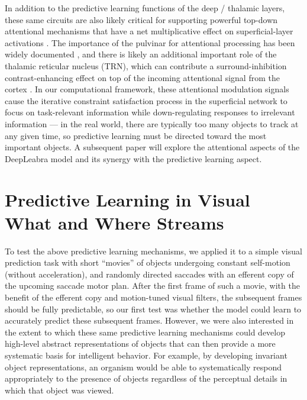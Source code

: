 \documentclass[11pt,twoside]{article}
\newif\myifpdf
\begin{document}
In addition to the predictive learning functions of the deep / thalamic layers, these same circuits are also likely critical for supporting powerful top-down attentional mechanisms that have a net multiplicative effect on superficial-layer activations \cite{BortoneOlsenScanziani14,OlsenBortoneAdesnikEtAl12,BortoneOlsenScanziani14,OlsenBortoneAdesnikEtAl12}. The importance of the pulvinar for attentional processing has been widely documented \cite[e.g.,]{LaBergeBuchsbaum90,BenderYouakim01,SaalmannPinskWangEtAl12}, and there is likely an additional important role of the thalamic reticular nucleus (TRN), which can contribute a surround-inhibition contrast-enhancing effect on top of the incoming attentional signal from the cortex \cite{Crick84,Pinault04,WimmerSchmittDavidsonEtAl15}.  In our computational framework, these attentional modulation signals cause the iterative constraint satisfaction process in the superficial network to focus on task-relevant information while down-regulating responses to irrelevant information --- in the real world, there are typically too many objects to track at any given time, so predictive learning must be directed toward the most important objects. A subsequent paper will explore the attentional aspects of the DeepLeabra model and its synergy with the predictive learning aspect.

\section{Predictive Learning in Visual What and Where Streams}

To test the above predictive learning mechanisms, we applied it to a simple visual prediction task with short ``movies'' of objects undergoing constant self-motion (without acceleration), and randomly directed saccades with an efferent copy of the upcoming saccade motor plan.  After the first frame of such a movie, with the benefit of the efferent copy and motion-tuned visual filters, the subsequent frames should be fully predictable, so our first test was whether the model could learn to accurately predict these subsequent frames.  However, we were also interested in the extent to which these same predictive learning mechanisms could develop high-level abstract representations of objects that can then provide a more systematic basis for intelligent behavior.  For example, by developing invariant object representations, an organism would be able to systematically respond appropriately to the presence of objects regardless of the perceptual details in which that object was viewed.
\end{document}
